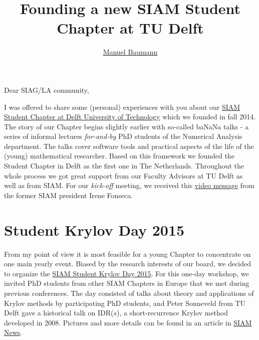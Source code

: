 \documentclass{article}
\title{\bf Founding a new SIAM Student Chapter at TU Delft}
\author{\href{http://www.manuelbaumann.de}{Manuel Baumann}}
\begin{document}
 
 \maketitle
 
 Dear SIAG/LA community,
 
 \noindent I was offered to share some (personal) experiences with you about our \href{http://sscdelft.github.io/}{SIAM Student Chapter at Delft University of Technology} which we founded in fall 2014. The story of our Chapter begins slightly earlier with so-called ba\color{red}NaN\color{black}a talks - a series of informal lectures \textit{for-and-by} PhD students of the Numerical Analysis department. The talks cover software tools and practical aspects of the life of the (young) mathematical researcher. Based on this framework we founded the Student Chapter in Delft as the first one in The Netherlands. Throughout the whole process we got great support from our Faculty Advisors at TU Delft as well as from SIAM. For our \textit{kick-off} meeting, we received this \href{https://www.youtube.com/watch?v=D9dobJG-ttw}{video message} from the former SIAM president Irene Fonseca.
 \section*{Student Krylov Day 2015}
 From my point of view it is most feasible for a young Chapter to concentrate on one main yearly event. Biased by the research interests of our board, we decided to organize the \href{http://sscdelft.github.io/activities/2015/02/02/krylov-day.html}{SIAM Student Krylov Day 2015}. For this one-day workshop, we invited PhD students from other SIAM Chapters in Europe that we met during previous conferences. The day consisted of talks about theory and applications of Krylov methods by participating PhD students, and Peter Sonneveld from TU Delft gave a historical talk on IDR($s$), a short-recurrence Krylov method developed in 2008. Pictures and more details can be found in an article in \href{https://sinews.siam.org/DetailsPage/tabid/607/ArticleID/504/European-Students-Gather-at-TU-Delft-for-Krylov-Day.aspx}{SIAM News}.
\end{document}
